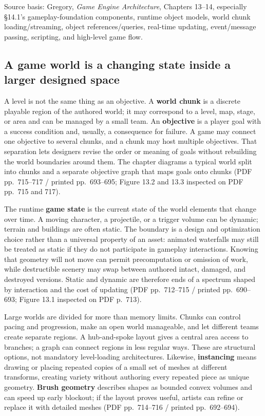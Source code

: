 Source basis: Gregory, \emph{Game Engine Architecture}, Chapters 13--14, especially §14.1's gameplay-foundation components, runtime object models, world chunk loading/streaming, object references/queries, real-time updating, event/message passing, scripting, and high-level game flow.

\subsection{A game world is a changing state inside a larger designed space}\label{06-engine-ii-ch031-a-game-world-is-a-changing-state-inside-a-larger-designed-space}

A level is not the same thing as an objective. A \textbf{world chunk} is a discrete playable region of the authored world; it may correspond to a level, map, stage, or area and can be managed by a small team. An \textbf{objective} is a player goal with a success condition and, usually, a consequence for failure. A game may connect one objective to several chunks, and a chunk may host multiple objectives. That separation lets designers revise the order or meaning of goals without rebuilding the world boundaries around them. The chapter diagrams a typical world split into chunks and a separate objective graph that maps goals onto chunks (PDF pp.~715--717 / printed pp.~693--695; Figure 13.2 and 13.3 inspected on PDF pp.~715 and 717).

The runtime \textbf{game state} is the current state of the world elements that change over time. A moving character, a projectile, or a trigger volume can be dynamic; terrain and buildings are often static. The boundary is a design and optimization choice rather than a universal property of an asset: animated waterfalls may still be treated as static if they do not participate in gameplay interactions. Knowing that geometry will not move can permit precomputation or omission of work, while destructible scenery may swap between authored intact, damaged, and destroyed versions. Static and dynamic are therefore ends of a spectrum shaped by interaction and the cost of updating (PDF pp.~712--715 / printed pp.~690--693; Figure 13.1 inspected on PDF p.~713).

Large worlds are divided for more than memory limits. Chunks can control pacing and progression, make an open world manageable, and let different teams create separate regions. A hub-and-spoke layout gives a central area access to branches; a graph can connect regions in less regular ways. These are structural options, not mandatory level-loading architectures. Likewise, \textbf{instancing} means drawing or placing repeated copies of a small set of meshes at different transforms, creating variety without authoring every repeated piece as unique geometry. \textbf{Brush geometry} describes shapes as bounded convex volumes and can speed up early blockout; if the layout proves useful, artists can refine or replace it with detailed meshes (PDF pp.~714--716 / printed pp.~692--694).

